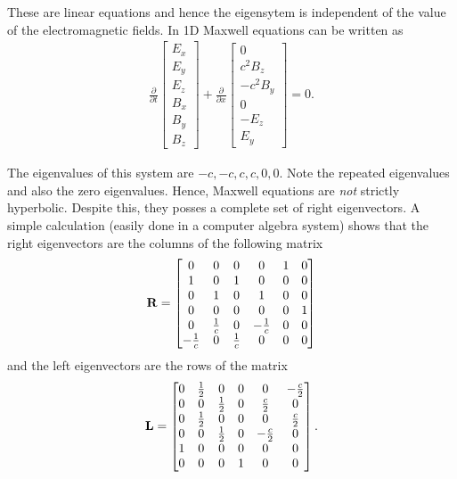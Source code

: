 \documentclass[12pt]{article}
\theoremstyle{definition}
\theoremstyle{definition}
\theoremstyle{definition}
\newcommand{\mvec}[1]{\mathbf{#1}}
\begin{document}
These are linear equations and hence the eigensytem is independent of
the value of the electromagnetic fields. In 1D Maxwell equations can
be written as
\begin{align}
  \frac{\partial }{\partial t}
  \left[
    \begin{matrix}
      E_x \\
      E_y \\
      E_z \\
      B_x \\
      B_y \\
      B_z
    \end{matrix}
  \right]
  +
  \frac{\partial }{\partial x}
  \left[
    \begin{matrix}
      0 \\
      c^2B_z \\
      -c^2B_y \\
      0 \\
      -E_z \\
      E_y
    \end{matrix}
  \right]
  =
  0.
\end{align}

The eigenvalues of this system are $-c,-c,c,c,0,0$. Note the repeated
eigenvalues and also the zero eigenvalues. Hence, Maxwell equations
are \emph{not} strictly hyperbolic. Despite this, they posses a
complete set of right eigenvectors. A simple calculation (easily done
in a computer algebra system) shows that the right eigenvectors are
the columns of the following matrix
\begin{align}
  \mvec{R}
  =
  \left[
    \begin{matrix}
    0&0&0&0&1&0 \\ 
    1&0&1&0&0&0 \\ 
    0&1&0&1&0&0 \\ 
    0&0&0&0&0&1 \\ 
    0&{{1}\over{c}}&0&-{{1}\over{c}}&0&0 \\ 
    -{{1}\over{c}}&0&{{1}\over{c}}&0&0&0
    \end{matrix}
  \right]  
\end{align}
and the left eigenvectors are the rows of the matrix
\begin{align}
  \mvec{L}
  =
  \left[
    \begin{matrix}
    0&{{1}\over{2}}&0&0&0&-{{c}\over{2}} \\
    0&0&{{1}\over{2}}&0&{{c}\over{2}}&0 \\
    0&{{1}\over{2}}&0&0&0&{{c}\over{2}} \\ 
    0&0&{{1}\over{2}}&0&-{{c}\over{2}}&0 \\
    1&0&0&0&0&0 \\ 
    0&0&0&1&0&0
    \end{matrix}
  \right].  
\end{align}
\end{document}
